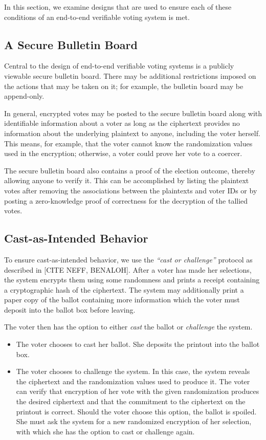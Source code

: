 In this section, we examine designs that are used to ensure each of these conditions of an end-to-end verifiable voting system is met.

\subsection{A Secure Bulletin Board}

Central to the design of end-to-end verifiable voting systems is a publicly viewable secure bulletin board. There may be additional restrictions imposed on the actions that may be taken on it; for example, the bulletin board may be append-only.

In general, encrypted votes may be posted to the secure bulletin board along with identifiable information about a voter as long as the ciphertext provides no information about the underlying plaintext to anyone, including the voter herself. This means, for example, that the voter cannot know the randomization values used in the encryption; otherwise, a voter could prove her vote to a coercer.

The secure bulletin board also contains a proof of the election outcome, thereby allowing anyone to verify it. This can be accomplished by listing the plaintext votes after removing the associations between the plaintexts and voter IDs or by posting a zero-knowledge proof of correctness for the decryption of the tallied votes.

\subsection{Cast-as-Intended Behavior}

To ensure cast-as-intended behavior, we use the \emph{``cast or challenge''} protocol as described in [CITE NEFF, BENALOH]. After a voter has made her selections, the system encrypts them using some randomness and prints a receipt containing a cryptographic hash of the ciphertext. The system may additionally print a paper copy of the ballot containing more information which the voter must deposit into the ballot box before leaving.

The voter then has the option to either \emph{cast} the ballot or \emph{challenge} the system.
\begin{itemize}
\item The voter chooses to cast her ballot. She deposits the printout into the ballot box.
\item The voter chooses to challenge the system. In this case, the system reveals the ciphertext and the randomization values used to produce it. The voter can verify that encryption of her vote with the given randomization produces the desired ciphertext and that the commitment to the ciphertext on the printout is correct. Should the voter choose this option, the ballot is spoiled. She must ask the system for a new randomized encryption of her selection, with which she has the option to cast or challenge again.
\end{itemize}

